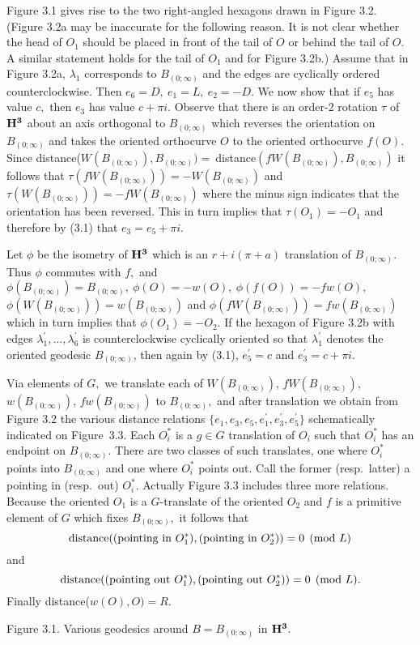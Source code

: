 Figure 3.1 gives rise to the two right-angled hexagons drawn in Figure 3.2.  (Figure 3.2a may be inaccurate for
the following reason.  It is not clear
 whether the head of $O_1$ should be placed in  front of the tail
of $O$ or behind the tail of $O.$  A similar statement holds for
the tail of $O_1$ and for Figure 3.2b.) Assume that in Figure
3.2a, $\lambda_1$  corresponds to $ B_{(0;\infty)}$ and the edges are
cyclically  ordered counterclockwise.  Then $e_6=D,\ 
e_1=L,\ e_2=-D.$     We now show that if $e_5$ has value $c,$ then
$e_3$ has value $c+\pi i.$ Observe that there is an order-2
rotation $\tau$ of ${\bf H^3}$ about an axis orthogonal to $ B_{(0;\infty)}$ which
reverses the orientation on $ B_{(0;\infty)}$ and takes the oriented
orthocurve $O$ to the oriented orthocurve $f(O).$  Since 
distance($W(B_{(0;\infty)}), B_{(0;\infty)})=\ $distance$(fW(B_{(0;\infty)}), B_{(0;\infty)})$ it follows that
$\tau(fW(B_{(0;\infty)}))=-W(B_{(0;\infty)})$ and $\tau(W(B_{(0;\infty)}))=-fW(B_{(0;\infty)})$ where the minus
sign indicates that the orientation has been reversed.   This in
turn implies   that $\tau(O_1)=-O_1$ and therefore by (3.1)
that  $e_3=e_5+\pi i.$ 
 





Let $\phi$ be the isometry of ${\bf H^3}$ which is an  $r+i(\pi+a)$
translation of $ B_{(0;\infty)}.$  Thus $\phi$ commutes with $f,$ and $\phi(B_{(0;\infty)})= B_{(0;\infty)}, \ \phi(O) = -w(O),\ 
\phi(f(O)) = -fw(O),$ $\phi(W(B_{(0;\infty)}))=w(B_{(0;\infty)})$
and $\phi(fW(B_{(0;\infty)}))=fw(B_{(0;\infty)})$  which in turn implies that
$\phi(O_1)=-O_2.$  If the hexagon of Figure 3.2b with
edges $\lambda^\prime_1,\ldots,\lambda^\prime_6$ is
counterclockwise cyclically oriented so that 
$\lambda^\prime_1$ denotes the oriented geodesic $ B_{(0;\infty)}$, then again
by (3.1),  $e_5^\prime=c$ and
$e_3^\prime=c+\pi i.$ 


Via elements of $G,$ we translate each of $W(B_{(0;\infty)})$, $fW(B_{(0;\infty)})$,  $w(B_{(0;\infty)})$,
$fw(B_{(0;\infty)})$ to $ B_{(0;\infty)},$ and after translation we obtain from Figure 3.2
the various distance relations 
$\{e_1, e_3, e_5, e_1^\prime, e_3^\prime, e_5^\prime\}$
schematically indicated on
Figure~3.3.  Each $O_i^*$ is a $g \in G$ translation of $O_i$ 
such that $O_i^*$ has an 
endpoint on $ B_{(0;\infty)}.$  There are two classes of such translates,
 one where $O_i^*$ points into $ B_{(0;\infty)}$ and one where
$O_i^*$ points out.  Call the former (resp.\ latter) a
pointing in (resp.\ out) $O_i^*.$  Actually Figure 3.3 includes
three more relations.   Because the oriented $O_1$ is a $G$-translate
of the oriented $O_2$ and $f$ is a primitive element of $G$ which
fixes $ B_{(0;\infty)},$ it follows that 
$${\rm distance}(({\rm pointing\ in}\ O_1^*),
({\rm pointing\ in }\ O_2^*))=0 \pmod L$$  and 
$${\rm distance}(({\rm pointing\ out}\ 
O_1^*), ({\rm pointing\ out}\ O_2^*))=0 \pmod L.$$  
Finally
distance($w(O),O)=R.$  
\vglue8pt
\centerline{Figure 3.1.  Various geodesics around $B = B_{(0;\infty)}$ in ${\bf H^3}.$}
\pagebreak


